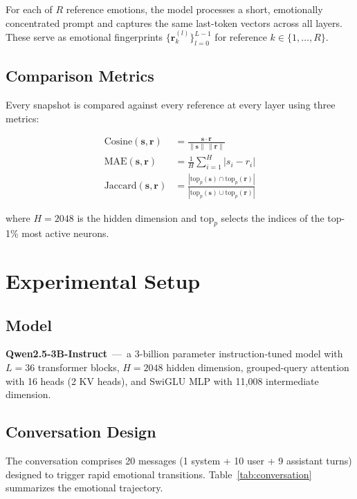 \documentclass[11pt,a4paper]{article}
\begin{document}
For each of $R$ reference emotions, the model processes a short, emotionally concentrated prompt and captures the same last-token vectors across all layers. These serve as emotional fingerprints $\{\mathbf{r}^{(l)}_k\}_{l=0}^{L-1}$ for reference $k \in \{1, \ldots, R\}$.

\subsection{Comparison Metrics}

Every snapshot is compared against every reference at every layer using three metrics:

\begin{align}
  \text{Cosine}(\mathbf{s}, \mathbf{r}) &= \frac{\mathbf{s} \cdot \mathbf{r}}{\|\mathbf{s}\| \, \|\mathbf{r}\|} \label{eq:cosine} \\
  \text{MAE}(\mathbf{s}, \mathbf{r}) &= \frac{1}{H} \sum_{i=1}^{H} |s_i - r_i| \label{eq:mae} \\
  \text{Jaccard}(\mathbf{s}, \mathbf{r}) &= \frac{|\text{top}_p(\mathbf{s}) \cap \text{top}_p(\mathbf{r})|}{|\text{top}_p(\mathbf{s}) \cup \text{top}_p(\mathbf{r})|} \label{eq:jaccard}
\end{align}

where $H = 2048$ is the hidden dimension and $\text{top}_p$ selects the indices of the top-1\% most active neurons.

\section{Experimental Setup}

\subsection{Model}

\textbf{Qwen2.5-3B-Instruct}~---~a 3-billion parameter instruction-tuned model with $L = 36$ transformer blocks, $H = 2048$ hidden dimension, grouped-query attention with 16 heads (2 KV heads), and SwiGLU MLP with 11,008 intermediate dimension.

\subsection{Conversation Design}

The conversation comprises 20 messages (1 system + 10 user + 9 assistant turns) designed to trigger rapid emotional transitions. Table~\ref{tab:conversation} summarizes the emotional trajectory.
\end{document}
